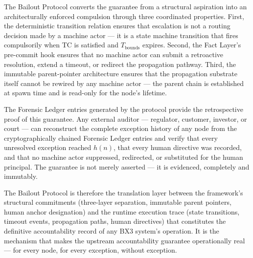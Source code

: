 The Bailout Protocol converts the guarantee from a structural aspiration into an architecturally enforced compulsion through three coordinated properties. First, the deterministic transition relation ensures that escalation is not a routing decision made by a machine actor — it is a state machine transition that fires compulsorily when TC is satisfied and $T_{\text{bounds}}$ expires. Second, the Fact Layer's pre-commit hook ensures that no machine actor can submit a retroactive resolution, extend a timeout, or redirect the propagation pathway. Third, the immutable parent-pointer architecture ensures that the propagation substrate itself cannot be rewired by any machine actor — the parent chain is established at spawn time and is read-only for the node's lifetime.

The Forensic Ledger entries generated by the protocol provide the retrospective proof of this guarantee. Any external auditor — regulator, customer, investor, or court — can reconstruct the complete exception history of any node from the cryptographically chained Forensic Ledger entries and verify that every unresolved exception reached $h(n)$, that every human directive was recorded, and that no machine actor suppressed, redirected, or substituted for the human principal. The guarantee is not merely asserted — it is evidenced, completely and immutably.

The Bailout Protocol is therefore the translation layer between the framework's structural commitments (three-layer separation, immutable parent pointers, human anchor designation) and the runtime execution trace (state transitions, timeout events, propagation paths, human directives) that constitutes the definitive accountability record of any BX3 system's operation. It is the mechanism that makes the upstream accountability guarantee operationally real — for every node, for every exception, without exception.